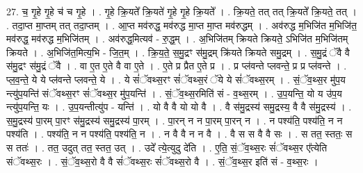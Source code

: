 \documentclass[17pt]{extarticle}
\begin{document}
27. च॒ गृ॒हे गृ॒हे च॑ च गृ॒हे । . गृ॒हे क्रि॒यते᳚ क्रि॒यते॑ गृ॒हे गृ॒हे क्रि॒यते᳚ । . क्रि॒यते॒ तत् तत् क्रि॒यते᳚ क्रि॒यते॒ तत् । . तदा॒प्त मा॒प्तम् तत् तदा॒प्तम् । . आ॒प्त मव॑रुद्ध॒ मव॑रुद्ध मा॒प्त मा॒प्त मव॑रुद्धम् । . अव॑रुद्ध म॒भिजि॑त म॒भिजि॑त॒ मव॑रुद्ध॒ मव॑रुद्ध म॒भिजि॑तम् । . अव॑रुद्ध॒मित्यव॑ - रु॒द्ध॒म् । . अ॒भिजि॑तम् क्रियते क्रियते॒ ऽभिजि॑त म॒भिजि॑तम् क्रियते । . अ॒भिजि॑त॒मित्य॒भि - जि॒त॒म् । . क्रि॒य॒ते॒ स॒मु॒द्रꣳ स॑मु॒द्रम् क्रि॑यते क्रियते समु॒द्रम् । . स॒मु॒द्रं ॅवै वै स॑मु॒द्रꣳ स॑मु॒द्रं ॅवै । . वा ए॒त ए॒ते वै वा ए॒ते । . ए॒ते प्र प्रैत ए॒ते प्र । . प्र प्ल॑वन्ते प्लवन्ते॒ प्र प्र प्ल॑वन्ते । . प्ल॒व॒न्ते॒ ये ये प्ल॑वन्ते प्लवन्ते॒ ये । . ये सं॑ॅवथ्स॒रꣳ सं॑ॅवथ्स॒रं ॅये ये सं॑ॅवथ्स॒रम् । . सं॒ॅव॒थ्स॒र मु॑प॒य न्त्यु॑प॒यन्ति॑ संॅवथ्स॒रꣳ सं॑ॅवथ्स॒र मु॑प॒यन्ति॑ । . सं॒ॅव॒थ्स॒रमिति॑ सं - व॒थ्स॒रम् । . उ॒प॒यन्ति॒ यो य उ॑प॒य न्त्यु॑प॒यन्ति॒ यः । . उ॒प॒यन्तीत्यु॑प - यन्ति॑ । . यो वै वै यो यो वै । . वै स॑मु॒द्रस्य॑ समु॒द्रस्य॒ वै वै स॑मु॒द्रस्य॑ । . स॒मु॒द्रस्य॑ पा॒रम् पा॒रꣳ स॑मु॒द्रस्य॑ समु॒द्रस्य॑ पा॒रम् । . पा॒रन् न न पा॒रम् पा॒रन् न । . न पश्य॑ति॒ पश्य॑ति॒ न न पश्य॑ति । . पश्य॑ति॒ न न पश्य॑ति॒ पश्य॑ति॒ न । . न वै वै न न वै । . वै स स वै वै सः । . स तत॒ स्ततः॒ स स ततः॑ । . तत॒ उदुत् तत॒ स्तत॒ उत् । . उदे᳚ त्ये॒त्युदु दे॑ति । . ए॒ति॒ सं॒ॅव॒थ्स॒रः सं॑ॅवथ्स॒र ए᳚त्येति संॅवथ्स॒रः । . सं॒ॅव॒थ्स॒रो वै वै सं॑ॅवथ्स॒रः सं॑ॅवथ्स॒रो वै । . सं॒ॅव॒थ्स॒र इति॑ सं - व॒थ्स॒रः । \newline
\end{document}
